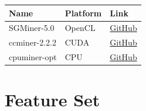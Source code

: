 \documentclass[11pt,a4paperpaper,]{report}
\begin{document}
\begin{longtable}[]{@{}lll@{}}
\toprule
\begin{minipage}[b]{0.19\columnwidth}\raggedright\strut
Name\strut
\end{minipage} & \begin{minipage}[b]{0.22\columnwidth}\raggedright\strut
Platform\strut
\end{minipage} & \begin{minipage}[b]{0.44\columnwidth}\raggedright\strut
Link\strut
\end{minipage}\tabularnewline
\midrule
\endhead
\begin{minipage}[t]{0.19\columnwidth}\raggedright\strut
SGMiner-5.0\strut
\end{minipage} & \begin{minipage}[t]{0.22\columnwidth}\raggedright\strut
OpenCL\strut
\end{minipage} & \begin{minipage}[t]{0.44\columnwidth}\raggedright\strut
\href{https://github.com/genesismining/sgminer-gm}{GitHub}\strut
\end{minipage}\tabularnewline
\begin{minipage}[t]{0.19\columnwidth}\raggedright\strut
ccminer-2.2.2\strut
\end{minipage} & \begin{minipage}[t]{0.22\columnwidth}\raggedright\strut
CUDA\strut
\end{minipage} & \begin{minipage}[t]{0.44\columnwidth}\raggedright\strut
\href{https://github.com/tpruvot/ccminer}{GitHub}\strut
\end{minipage}\tabularnewline
\begin{minipage}[t]{0.19\columnwidth}\raggedright\strut
cpuminer-opt\strut
\end{minipage} & \begin{minipage}[t]{0.22\columnwidth}\raggedright\strut
CPU\strut
\end{minipage} & \begin{minipage}[t]{0.44\columnwidth}\raggedright\strut
\href{https://github.com/tpruvot/cpuminer-multi}{GitHub}\strut
\end{minipage}\tabularnewline
\bottomrule
\end{longtable}

\chapter{Feature Set}\label{feature-set}
\end{document}
